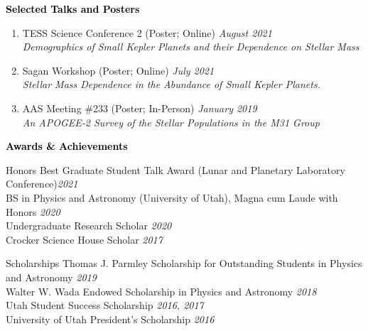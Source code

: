 \documentclass{resume} %
\newcommand{\mystrut}{\rule[-.3\baselineskip]{0pt}{\baselineskip}}
\renewenvironment{rSection}[1]{\mystrut{\textcolor{black}{{\large{\textbf{#1}}}}}
\vspace{-5pt} %
\begin{list}{}{
\setlength{\leftmargin}{0em}
}
\item[]
}{
\end{list}
}
\begin{document}
\begin{rSection}{Selected Talks and Posters}
\begin{enumerate}
\item{TESS Science Conference 2 (Poster; Online)} \hfill {\em August 2021} \\
\textit{Demographics of Small Kepler Planets and their Dependence on Stellar Mass}

\item{Sagan Workshop (Poster; Online)} \hfill {\em July 2021} \\
\textit{Stellar Mass Dependence in the Abundance of Small Kepler Planets.}

\item{AAS Meeting \#233 (Poster; In-Person)} \hfill {\em January 2019} \\
\textit{An APOGEE-2 Survey of the Stellar Populations in the M31 Group}

\end{enumerate}
\end{rSection}
\vspace{5pt}\hline
\vspace{0pt}


\begin{rSection}{Awards \& Achievements} \itemsep -2pt
\begin{rSubsection}{Honors}{}{}{}
{Best Graduate Student Talk Award (Lunar and Planetary Laboratory Conference)\hfill {\em 2021}}\\
{BS in Physics and Astronomy (University of Utah), Magna cum Laude with Honors \hfill {\em 2020}}\\
{Undergraduate Research Scholar \hfill {\em 2020}}\\
{Crocker Science House Scholar \hfill {\em 2017}}
\end{rSubsection}
\begin{rSubsection}{Scholarships}{}{}{}
{Thomas J. Parmley Scholarship for Outstanding Students in Physics and Astronomy \hfill {\em 2019}}\\
{Walter W. Wada Endowed Scholarship in Physics and Astronomy \hfill {\em 2018}}\\
{Utah Student Success Scholarship \hfill {\em 2016, 2017}}\\
{University of Utah President’s Scholarship \hfill {\em 2016}}
\end{rSubsection}
\end{rSection}
\vspace{10pt}\hline
\vspace{0pt}
\end{document}
